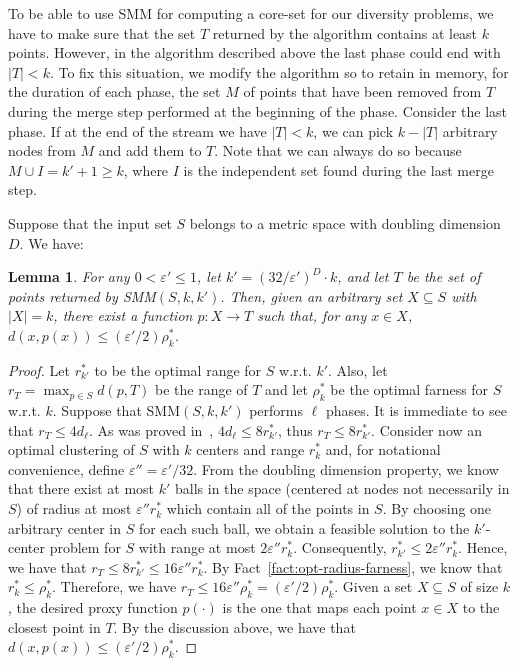 \documentclass{article}
\newtheorem{lemma}{Lemma}
\renewcommand{\epsilon}{\varepsilon}
\begin{document}
To be able to use {\sc SMM} for computing a core-set for our diversity
problems, we have to make sure that the set $T$ returned by the
algorithm contains at least $k$ points. However, in the algorithm
described above the last phase could end with $|T| < k$. To fix this
situation, we modify the algorithm so to retain in memory, for the
duration of each phase, the set $M$ of points that have been removed
from $T$ during the merge step performed at the beginning of the
phase. Consider the last phase. If at the end of the stream we have
$|T| < k$, we can pick $k - |T|$ arbitrary nodes from $M$ and add them
to $T$. Note that we can always do so because
$M \cup I = k' + 1 \ge k$, where $I$ is the independent set found
during the last merge step.

Suppose that the input set $S$ belongs to a metric space with doubling
dimension $D$. We have:
\begin{lemma}\label{lem:smm-properties}
  For any $0 < \epsilon' \leq 1$, let $k'=(32/\epsilon')^D\cdot k$,
  and let $T$ be the set of points returned by {\sc SMM}$(S, k,
  k')$. Then, given an arbitrary set $X\subseteq S$ with $|X|=k$,
  there exist a function $p: X\rightarrow T$ such that, for any
  $x\in X$, $d(x, p(x))\le (\epsilon'/2)\rho^*_k$.
\end{lemma}
\begin{proof}
  Let $r_{k'}^*$ to be the optimal range for $S$ w.r.t. $k'$.  Also,
  let $r_{T}=\max_{p\in S} d(p, T)$ be the range of $T$ and let
  $\rho_k^*$ be the optimal farness for $S$ w.r.t. $k$.  Suppose that
  {\sc SMM}$(S, k, k')$ performs $\ell$ phases.  It is immediate to
  see that $r_T \leq 4d_\ell$. As was proved in~\cite{CharikarCFM04},
  $ 4d_\ell \leq 8r_{k'}^*$, thus $r_T \leq 8r_{k'}^*$. Consider now
  an optimal clustering of $S$ with $k$ centers and range $r_k^*$ and,
  for notational convenience, define $\epsilon''=\epsilon'/32$. From
  the doubling dimension property, we know that there exist at most
  $k'$ balls in the space (centered at nodes not necessarily in $S$)
  of radius at most $\epsilon'' r_k^*$ which contain all of the points
  in $S$. By choosing one arbitrary center in $S$ for each such ball,
  we obtain a feasible solution to the $k'$-center problem for $S$
  with range at most $2\epsilon'' r_k^*$. Consequently,
  $r_{k'}^* \le 2\epsilon'' r_k^*$. Hence, we have that
  $r_T \le 8r_{k'}^* \le 16\epsilon'' r_k^*$. By
  Fact~\ref{fact:opt-radius-farness}, we know that
  $r_k^* \le \rho_{k}^*$. Therefore, we have
  $r_T \le 16\epsilon'' \rho_k^* = (\epsilon'/2)\rho_k^*$.  Given a
  set $X\subseteq S$ of size $k$, the desired proxy function
  $p(\cdot)$ is the one that maps each point $x\in X$ to the closest
  point in $T$. By the discussion above, we have that
  $d(x, p(x))\le (\epsilon'/2)\rho_k^*$.
\end{proof}
\end{document}
